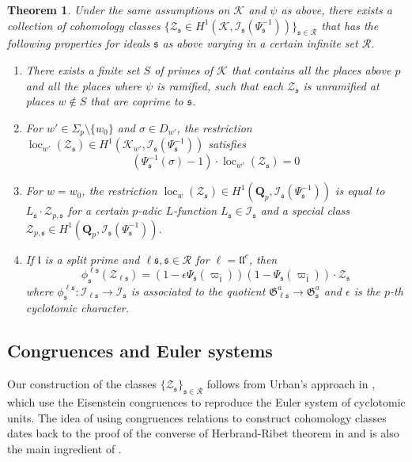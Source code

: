 \documentclass[leqno]{amsart}
\newtheorem{thm}{Theorem}[section]
\theoremstyle{definition}
\theoremstyle{remark}
\newcommand{\Qp}{\mathbf{Q}_p}
\newcommand{\fl}{\mathfrak{l}}
\newcommand{\fs}{\mathfrak{s}}
\newcommand{\K}{{\mathcal{K}}} %
\newcommand{\fG}{\mathfrak{G}}
\newcommand{\I}{\mathcal{I}} %
\DeclareMathOperator{\loc}{loc}
\begin{document}
\begin{thm}

Under the same assumptions on $\K$ and $\psi$ as above,
there exists a collection of cohomology classes
$\{\mathcal{Z}_\fs\in H^1(\K, \I_\fs(\Psi_\fs^{-1}))\}_{\fs\in\mathcal{R}}$
that has the following properties
for ideals $\fs$ as above varying 
in a certain infinite set $\mathcal{R}$.
\begin{enumerate}
    \item There exists a finite set $S$ of primes of $\K$
    that contains all the places above $p$ and all the 
    places where $\psi$ is ramified, such that each
    $\mathcal{Z}_{\fs}$ is unramified at places $w\notin S$
    that are coprime to $\fs$.
    \item For $w'\in \Sigma_p\setminus\{w_0\}$
    and $\sigma\in D_{w'}$, the restriction
    $\loc_{w'}(\mathcal{Z}_\fs)\in H^1(\K_{w'}, \I_\fs(\Psi_\fs^{-1}))$
    satisfies 
    \[
        (\Psi_{\fs}^{-1}(\sigma)-1)\cdot \loc_{w'}(\mathcal{Z}_\fs)=0
    \]
    \item For $w=w_0$, the restriction 
    $\loc_{w}(\mathcal{Z}_\fs)\in H^1(\Qp, \I_\fs(\Psi_\fs^{-1}))$
    is equal to $L_\fs\cdot \mathcal{Z}_{p,\fs}$ for
    a certain $p$-adic $L$-function $L_\fs\in \I_\fs$ 
    and a special class
    $\mathcal{Z}_{p,\fs}\in H^1(\Qp, \I_\fs(\Psi_\fs^{-1}))$.
    \item If $\fl$ is a split prime 
    and $\ell\fs,\fs\in \mathcal{R}$ for $\ell=\fl\fl^c$, then
    \[
        \phi^{\ell\fs}_\fs(\mathcal{Z}_{\ell\fs})=
        (1-\epsilon\Psi_{\fs}(\varpi_{\bar{\fl}}))
        (1-\Psi_\fs(\varpi_{\bar{\fl}}))\cdot 
        \mathcal{Z}_{\fs}
    \]
    where $\phi^{\ell\fs}_\fs\colon \I_{\ell\fs}\to \I_\fs$
    is associated to the quotient $\fG_{\ell\fs}^a\to \fG_\fs^a$
    and $\epsilon$ is the $p$-th cyclotomic character.
\end{enumerate}
\end{thm}

\subsection*{Congruences and Euler systems}

Our construction of the classes $\{\mathcal{Z}_\fs\}_{\fs\in\mathcal{R}}$
follows from Urban's approach in \cite{urban},
which use the Eisenstein congruences 
to reproduce the Euler system of cyclotomic units.
The idea of using congruences relations to construct cohomology classes
dates back to the proof of the converse of
Herbrand-Ribet theorem in \cite{Ribet1976}
and is also the main ingredient of \cite{HT93}.
\end{document}
